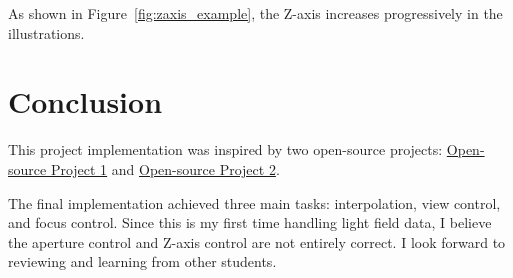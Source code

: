 \documentclass{article}
\begin{document}
As shown in Figure~\ref{fig:zaxis_example}, the Z-axis increases progressively in the illustrations.



\section{Conclusion}
This project implementation was inspired by two open-source projects: 
\href{https://github.com/chiped/LightFieldRenderer}{Open-source Project 1} and 
\href{https://github.com/TachikakaMin/Light_Field_Refocusing}{Open-source Project 2}.

The final implementation achieved three main tasks: interpolation, view control, and focus control. 
Since this is my first time handling light field data, I believe the aperture control and Z-axis control are not entirely correct. 
I look forward to reviewing and learning from other students.
\end{document}
